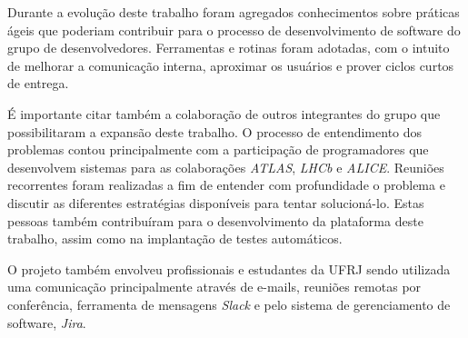 Durante a evolução deste trabalho foram agregados conhecimentos sobre práticas ágeis que poderiam contribuir para o processo de desenvolvimento de software do grupo de desenvolvedores. Ferramentas e rotinas foram adotadas, com o intuito de melhorar a comunicação interna, aproximar os usuários e prover ciclos curtos de entrega.

É importante citar também a colaboração de outros integrantes do grupo que possibilitaram a expansão deste trabalho. O processo de entendimento dos problemas contou principalmente com a participação de programadores que desenvolvem sistemas para as colaborações \emph{ATLAS}, \emph{LHCb} e \emph{ALICE}. Reuniões recorrentes foram realizadas a fim de entender com profundidade o problema e discutir as diferentes estratégias disponíveis para tentar solucioná-lo. Estas pessoas também contribuíram para o desenvolvimento da plataforma deste trabalho, assim como na implantação de testes automáticos.

O projeto também envolveu profissionais e estudantes da UFRJ sendo utilizada uma comunicação principalmente através de e-mails, reuniões remotas por conferência, ferramenta de mensagens \emph{Slack} e pelo sistema de gerenciamento de software, \emph{Jira}.
